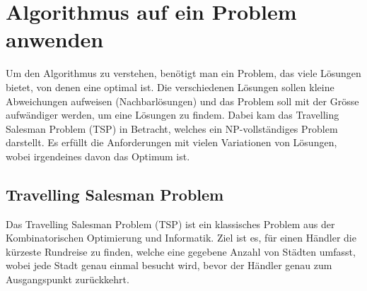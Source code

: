 %
%
%
%
\section{Algorithmus auf ein Problem anwenden
\label{variationsprinzip_algorithmen:section:find_problem}}
Um den Algorithmus zu verstehen, benötigt man ein Problem, das 
viele Lösungen bietet, von denen eine optimal ist. Die verschiedenen 
Lösungen sollen kleine Abweichungen aufweisen (Nachbarlösungen) 
und das Problem soll mit der Grösse aufwändiger werden, um eine 
Lösungen zu findem. Dabei kam das Travelling Salesman Problem (TSP) 
in Betracht, welches ein NP-vollständiges Problem darstellt. Es 
erfüllt die Anforderungen mit vielen Variationen von Lösungen, wobei
irgendeines davon das Optimum ist.

\subsection{Travelling Salesman Problem
\label{variationsprinzip_algorithmen:section:tsp}}
Das Travelling Salesman Problem (TSP) ist ein klassisches Problem 
aus der Kombinatorischen Optimierung und Informatik. Ziel ist es, 
für einen Händler die kürzeste Rundreise zu finden, welche eine 
gegebene Anzahl von Städten umfasst, wobei jede Stadt 
genau einmal besucht wird, bevor der Händler genau zum Ausgangspunkt 
zurückkehrt. 

